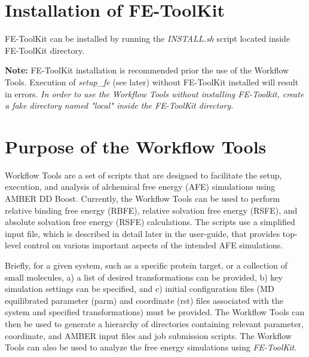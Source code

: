 \documentclass[11pt,letterpaper,titlepage]{article}
\begin{document}
\vspace{0.1cm}

\vspace{0.1cm}
\section{Installation of FE-ToolKit}
\vspace{0.1cm}

FE-ToolKit can be installed by running the \textit{INSTALL.sh} script located 
inside FE-ToolKit directory.

\vspace{0.1cm}
\textbf{Note:} FE-ToolKit installation is recommended prior the use of the Workflow Tools. 
Execution of \textit{setup\_fe} (see later) without FE-ToolKit installed will result in errors. 
\textit{In order to use the  Workflow Tools without installing FE-Toolkit, create a fake 
directory named "local" inside the FE-ToolKit directory.}
\vspace{0.1cm}

\vspace{0.1cm}
\section{Purpose of the Workflow Tools}
\vspace{0.1cm}

Workflow Tools are a set of scripts that are designed to 
facilitate the setup, execution, and analysis of alchemical 
free energy (AFE) simulations using AMBER DD Boost. Currently, the 
Workflow Tools can be used to perform relative binding
free energy (RBFE), relative solvation free energy (RSFE), and 
absolute solvation free energy (RSFE) calculations. The scripts
use a
simplified input file, which is described in detail later in the 
user-guide, that provides top-level control on various important 
aspects of the intended AFE simulations. 

Briefly, for a given system, such as a specific protein target, or 
a collection of small molecules, 
a) a list of desired transformations can be provided, 
b) key simulation settings can be specified, and 
c) initial configuration files (MD equilibrated parameter (parm) and 
coordinate (rst) files associated with the system and
specified transformations) must be provided. 
The Workflow Tools can then be used to generate a hierarchy of directories 
containing relevant parameter, coordinate, and AMBER input files and job submission scripts. 
The Workflow Tools can also be used 
to analyze the free energy simulations using \textit{FE-ToolKit}.
\end{document}
